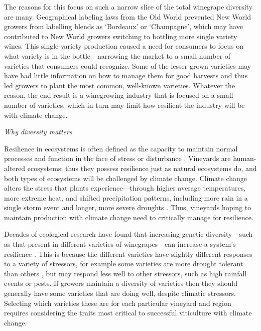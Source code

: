 \documentclass[11pt,letterpaper]{article}
\begin{document}
The reasons for this focus on such a narrow slice of the total winegrape diversity are many. Geographical labeling laws from the Old World prevented New World growers from labelling blends as `Bordeaux' or `Champagne', which may have contributed to New World growers switching to bottling more single variety wines. This single-variety production caused a need for consumers to focus on what variety is in the bottle---narrowing the market to a small number of varieties that consumers could recognize. Some of the lesser-grown varieties may have had little information on how to manage them for good harvests and thus led growers to plant the most common, well-known varieties. Whatever the reason, the end result is a winegrowing industry that is focused on a small number of varieties, which in turn may limit how resilient the industry will be with climate change. 


\emph{Why diversity matters}

Resilience in ecosystems is often defined as the capacity to maintain normal processes and function in the face of stress or disturbance \citep{Folke2004}. Vineyards are human-altered ecosystems; thus they possess resilience just as natural ecosystems do, and both types of ecosystems will be challenged by climate change. Climate change alters the stress that plants experience---through higher average temperatures, more extreme heat, and shifted precipitation patterns, including more rain in a single storm event and longer, more severe droughts \citep{ipcc2013,knutti2013}. Thus, vineyards hoping to maintain production with climate change need to critically manage for resilience. %

Decades of ecological research have found that increasing genetic diversity---such as that present in different varieties of winegrapes---can increase a system's resilience \citep{Folke2004}. This is because the different varieties have slightly different responses to a variety of stressors, for example some varieties are more drought tolerant than others \citep{bota2016}, but may respond less well to other stressors, such as high rainfall events or pests. If growers maintain a diversity of varieties then they should generally have some varieties that are doing well, despite climatic stressors. Selecting which varieties these are for each particular vineyard and region requires considering the traits most critical to successful viticulture with climate change.
\end{document}
